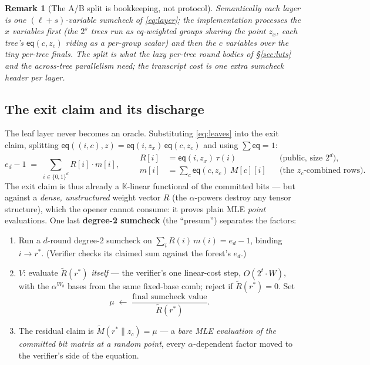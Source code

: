 \documentclass[11pt]{article}
\newcommand{\K}{\mathbb{K}}            %
\newcommand{\bits}{\{0,1\}}
\newcommand{\mle}[1]{\widetilde{#1}}
\newcommand{\eq}{\mathsf{eq}}
\newtheorem{remark}{Remark}
\theoremstyle{definition}
\begin{document}
\begin{remark}[The A/B split is bookkeeping, not protocol]
Semantically each layer is one $(\ell + s)$-variable sumcheck of
\eqref{eq:layer}; the implementation processes the $x$ variables first
(the $2^s$ trees run as eq-weighted groups sharing the point $z_x$, each
tree's $\eq(c, z_c)$ riding as a per-group scalar) and then the $c$
variables over the tiny per-tree finals.  The split is what the lazy
per-tree round bodies of \S\ref{sec:luts} and the across-tree
parallelism need; the transcript cost is one extra sumcheck header per
layer.
\end{remark}

\subsection{The exit claim and its discharge}
\label{sec:discharge}

The leaf layer never becomes an oracle.  Substituting
\eqref{eq:leaves} into the exit claim, splitting
$\eq((i,c), z) = \eq(i, z_x)\,\eq(c, z_c)$ and using
$\sum \eq = 1$:
\begin{equation}\label{eq:exit}
  e_d - 1
  \;=\; \sum_{i \in \bits^d} R[i]\cdot m[i],
  \qquad
  \begin{aligned}
    R[i] &= \eq(i, z_x)\,\tau(i)
      && \text{(public, size } 2^d\text{)},\\
    m[i] &= \textstyle\sum_c \eq(c, z_c)\, M[c][i]
      && \text{(the $z_c$-combined rows)}.
  \end{aligned}
\end{equation}
The exit claim is thus already a $\K$-linear functional of the committed
bits --- but against a \emph{dense, unstructured} weight vector $R$ (the
$\alpha$-powers destroy any tensor structure), which the opener cannot
consume: it proves plain MLE \emph{point} evaluations.  One last
\textbf{degree-2 sumcheck} (the ``presum'') separates the factors:

\begin{enumerate}[leftmargin=2.2em, itemsep=2pt]
\item Run a $d$-round degree-2 sumcheck on
  $\sum_i R(i)\, m(i) = e_d - 1$, binding $i \to r^*$.  (Verifier
  checks its claimed sum against the forest's $e_d$.)
\item $V$: evaluate $\mle{R}(r^*)$ \emph{itself} --- the verifier's one
  linear-cost step, $O(2^t \cdot W)$, with the $\alpha^{W_b}$ bases from
  the same fixed-base comb; reject if $\mle{R}(r^*) = 0$.  Set
  \[
    \mu \;\leftarrow\; \frac{\text{final sumcheck value}}{\mle{R}(r^*)}.
  \]
\item The residual claim is
  $\mle{M}(r^* \| z_c) = \mu$ --- a \emph{bare MLE evaluation of the
  committed bit matrix at a random point}, every $\alpha$-dependent
  factor moved to the verifier's side of the equation.
\end{enumerate}
\end{document}
